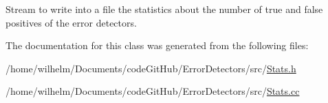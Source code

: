 Stream to write into a file the statistics about the number of true and false positives of the error detectors. 



The documentation for this class was generated from the following files\+:\begin{DoxyCompactItemize}
\item 
/home/wilhelm/\+Documents/code\+Git\+Hub/\+Error\+Detectors/src/\hyperlink{_stats_8h}{Stats.\+h}\item 
/home/wilhelm/\+Documents/code\+Git\+Hub/\+Error\+Detectors/src/\hyperlink{_stats_8cc}{Stats.\+cc}\end{DoxyCompactItemize}
